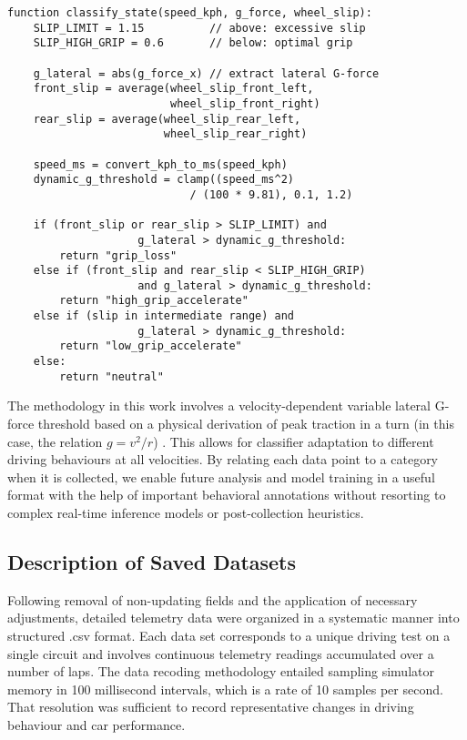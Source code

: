 \documentclass[a4paper,final,12pt]{report}
\begin{document}
\begin{verbatim}
function classify_state(speed_kph, g_force, wheel_slip):
    SLIP_LIMIT = 1.15          // above: excessive slip
    SLIP_HIGH_GRIP = 0.6       // below: optimal grip

    g_lateral = abs(g_force_x) // extract lateral G-force
    front_slip = average(wheel_slip_front_left, 
                         wheel_slip_front_right)
    rear_slip = average(wheel_slip_rear_left,
                        wheel_slip_rear_right)

    speed_ms = convert_kph_to_ms(speed_kph)
    dynamic_g_threshold = clamp((speed_ms^2) 
                            / (100 * 9.81), 0.1, 1.2)

    if (front_slip or rear_slip > SLIP_LIMIT) and 
                    g_lateral > dynamic_g_threshold:
        return "grip_loss"
    else if (front_slip and rear_slip < SLIP_HIGH_GRIP)
                    and g_lateral > dynamic_g_threshold:
        return "high_grip_accelerate"
    else if (slip in intermediate range) and
                    g_lateral > dynamic_g_threshold:
        return "low_grip_accelerate"
    else:
        return "neutral"
\end{verbatim}

The methodology in this work involves a velocity-dependent variable lateral G-force threshold based on a physical derivation of peak traction in a turn (in this case, the relation $g = v^2 / r$) \cite{halliday2013fundamentals}. This allows for classifier adaptation to different driving behaviours at all velocities. By relating each data point to a category when it is collected, we enable future analysis and model training in a useful format with the help of important behavioral annotations without resorting to complex real-time inference models or post-collection heuristics.

\newpage
\subsection{Description of Saved Datasets}
Following removal of non-updating fields and the application of necessary adjustments, detailed telemetry data were organized in a systematic manner into structured .csv format. Each data set corresponds to a unique driving test on a single circuit and involves continuous telemetry readings accumulated over a number of laps. The data recoding methodology entailed sampling simulator memory in 100 millisecond intervals, which is a rate of 10 samples per second. That resolution was sufficient to record representative changes in driving behaviour and car performance.\\
\end{document}

